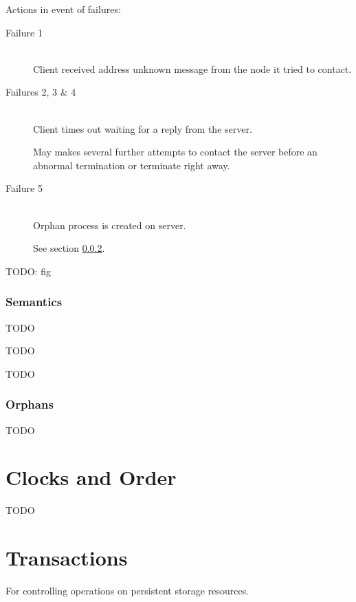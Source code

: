 \documentclass[a4paper]{article}
\begin{document}
Actions in event of failures:

\begin{description}
  \item[Failure 1] \hfill \\
    Client received address unknown message from the node it tried to contact.

  \item[Failures 2, 3 \& 4] \hfill \\
    Client times out waiting for a reply from the server.

    May makes several further attempts to contact the server before an abnormal
    termination or terminate right away.

  \item[Failure 5] \hfill \\
    Orphan process is created on server.

    See section \ref{sec:rpc_orphans}.

\end{description}

TODO: fig

\subsubsection{Semantics}


TODO


TODO


TODO

\subsubsection{Orphans}
\label{sec:rpc_orphans}

TODO

\section{Clocks and Order}

TODO

\section{Transactions}

For controlling operations on persistent storage resources.
\end{document}
